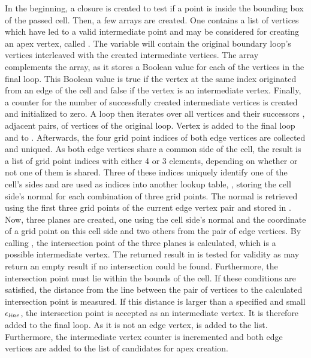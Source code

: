 %
In the beginning, a closure is created to test if a point is inside the bounding box of the passed cell.
Then, a few arrays are created.
One contains a list of vertices which have led to a valid intermediate point and may be considered for creating an apex vertex, called .
The variable  will contain the original boundary loop's vertices interleaved with the created intermediate vertices.
The  array complements the  array, as it stores a Boolean value for each of the vertices in the final loop.
This Boolean value is true if the vertex at the same index originated from an edge of the cell and false if the vertex is an intermediate vertex.
Finally, a counter for the number of successfully created intermediate vertices is created and initialized to zero.
A loop then iterates over all vertices  and their successors , \ie adjacent pairs, of vertices of the original loop.
Vertex  is added to the final loop and \True to .
Afterwards, the four grid point indices of both edge vertices are collected and uniqued.
As both edge vertices share a common side of the cell, the result is a list of grid point indices with either 4 or 3 elements, depending on whether or not one of them is shared.
Three of these indices uniquely identify one of the cell's sides and are used as indices into another lookup table, , storing the cell side's normal for each combination of three grid points.
The normal is retrieved using the first three grid points of the current edge vertex pair and stored in .
Now, three planes are created, one using the cell side's normal and the coordinate of a grid point on this cell side and two others from the pair of edge vertices.
By calling , the intersection point of the three planes is calculated, which is a possible intermediate vertex.
The returned result in  is tested for validity as  may return an empty result if no intersection could be found.
Furthermore, the intersection point must lie within the bounds of the cell.
If these conditions are satisfied, the distance from the line between the pair of vertices to the calculated intersection point is measured.
If this distance is larger than a specified and small $\epsilon_{\mathit{line}}$, the intersection point is accepted as an intermediate vertex.
It is therefore added to the final loop.
As it is not an edge vertex, \False is added to the  list.
Furthermore, the intermediate vertex counter is incremented and both edge vertices are added to the list of candidates for apex creation.

